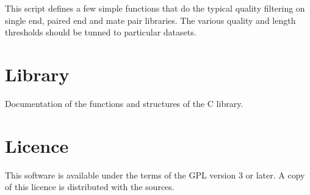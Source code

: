 \documentclass[a4paper,12pt]{article}
\begin{document}
This script defines a few simple functions that do the typical quality
filtering on single end, paired end and mate pair libraries.
The various quality and length thresholds should be tunned to particular
datasets.


\section{Library}

Documentation of the functions and structures of the C library.


\section{Licence}

This software is available under the terms of the GPL version 3 or later.
A copy of this licence is distributed with the sources.
\end{document}
